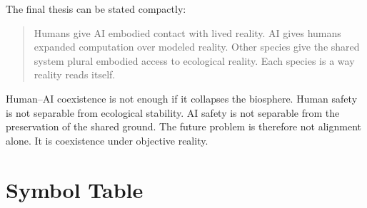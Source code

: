 \documentclass[11pt,a4paper]{article}
\begin{document}
The final thesis can be stated compactly:

\begin{quote}
Humans give AI embodied contact with lived reality. AI gives humans expanded computation over modeled reality. Other species give the shared system plural embodied access to ecological reality. Each species is a way reality reads itself.
\end{quote}

Human--AI coexistence is not enough if it collapses the biosphere. Human safety is not separable from ecological stability. AI safety is not separable from the preservation of the shared ground. The future problem is therefore not alignment alone. It is coexistence under objective reality.

\appendix

\section{Symbol Table}
\end{document}
